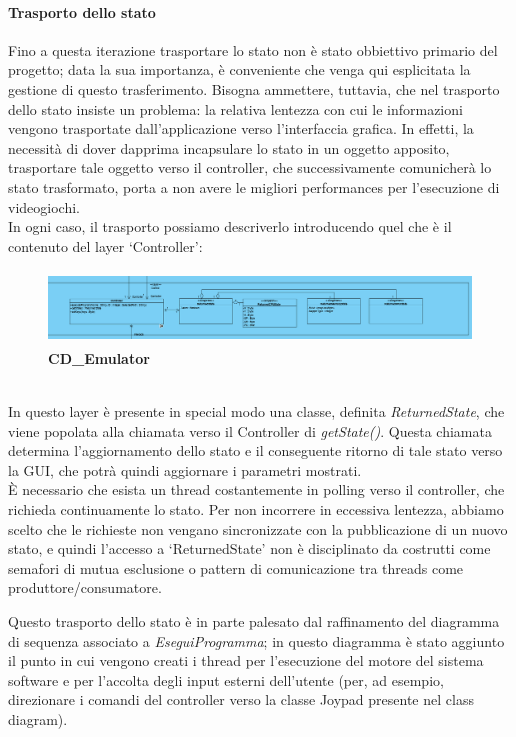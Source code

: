 \documentclass[11pt]{article}
\begin{document}
\paragraph{Trasporto dello stato}
Fino a questa iterazione trasportare lo stato non è stato obbiettivo primario del progetto; data la sua importanza, è conveniente che venga qui esplicitata la gestione di questo trasferimento. Bisogna ammettere, tuttavia, che nel trasporto dello stato insiste un problema: la relativa lentezza con cui le informazioni vengono trasportate dall'applicazione verso l'interfaccia grafica. In effetti, la necessità di dover dapprima incapsulare lo stato in un oggetto apposito, trasportare tale oggetto verso il controller, che successivamente comunicherà lo stato trasformato, porta a non avere le migliori performances per l'esecuzione di videogiochi.\\
In ogni caso, il trasporto possiamo descriverlo introducendo quel che è il contenuto del layer `Controller':
\begin{figure}[h]
\hspace*{-2cm}
\centering
\includegraphics[width=500px, height=74px]{CD_Emulator_6.png}\\
\small\textbf{CD\_Emulator}
\end{figure}\\
In questo layer è presente in special modo una classe, definita \emph{ReturnedState}, che viene popolata alla chiamata verso il Controller di \emph{getState()}. Questa chiamata determina l'aggiornamento dello stato e il conseguente ritorno di tale stato verso la GUI, che potrà quindi aggiornare i parametri mostrati.\\
È necessario che esista un thread costantemente in polling verso il controller, che richieda continuamente lo stato. Per non incorrere in eccessiva lentezza, abbiamo scelto che le richieste non vengano sincronizzate con la pubblicazione di un nuovo stato, e quindi l'accesso a `ReturnedState' non è disciplinato da costrutti come semafori di mutua esclusione o pattern di comunicazione tra threads come produttore/consumatore.

Questo trasporto dello stato è in parte palesato dal raffinamento del diagramma di sequenza associato a \emph{EseguiProgramma}; in questo diagramma è stato aggiunto il punto in cui vengono creati i thread per l'esecuzione del motore del sistema software e per l'accolta degli input esterni dell'utente (per, ad esempio, direzionare i comandi del controller verso la classe Joypad presente nel class diagram).
\end{document}
